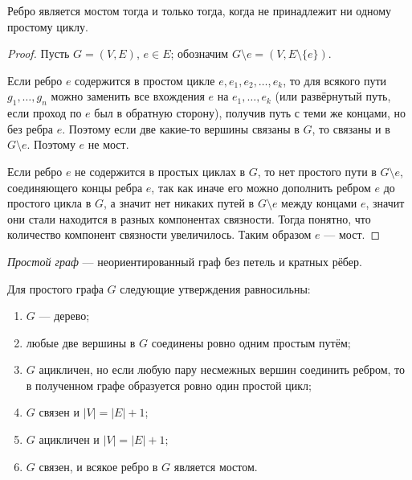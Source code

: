 \documentclass[12pt,a4paper]{article}
\begin{document}
    \begin{theorem}[о мостах]
        Ребро является мостом тогда и только тогда, когда не принадлежит ни одному простому циклу.
    \end{theorem}

    \begin{proof}
        Пусть $G = (V, E)$, $e \in E$; обозначим $G \setminus e = (V, E \setminus \{e\})$.

        Если ребро $e$ содержится в простом цикле $e, e_1, e_2, \dots, e_k$, то для всякого пути $g_1, \dots, g_n$ можно заменить все вхождения $e$ на $e_1, \dots, e_k$ (или развёрнутый путь, если проход по $e$ был в обратную сторону), получив путь с теми же концами, но без ребра $e$. Поэтому если две какие-то вершины связаны в $G$, то связаны и в $G \setminus e$. Поэтому $e$ не мост.

        Если ребро $e$ не содержится в простых циклах в $G$, то нет простого пути в $G \setminus e$, соединяющего концы ребра $e$, так как иначе его можно дополнить ребром $e$ до простого цикла в $G$, а значит нет никаких путей в $G \setminus e$ между концами $e$, значит они стали находится в разных компонентах связности. Тогда понятно, что количество компонент связности увеличилось. Таким образом $e$ --- мост.
    \end{proof}

    \begin{definition}
        \emph{Простой граф} --- неориентированный граф без петель и кратных рёбер.
    \end{definition}

    \begin{theorem}[о деревьях]
        Для простого графа $G$ следующие утверждения равносильны:
        \begin{enumerate}
            \renewcommand{\labelenumi}{(\theenumi)}
            \item $G$ --- дерево;
            \item любые две вершины в $G$ соединены ровно одним простым путём;
            \item $G$ ацикличен, но если любую пару несмежных вершин соединить ребром, то в полученном графе образуется ровно один простой цикл;
            \item $G$ связен и $|V| = |E| + 1$;
            \item $G$ ацикличен и $|V| = |E| + 1$;
            \item $G$ связен, и всякое ребро в $G$ является мостом.
        \end{enumerate}
    \end{theorem}
\end{document}
